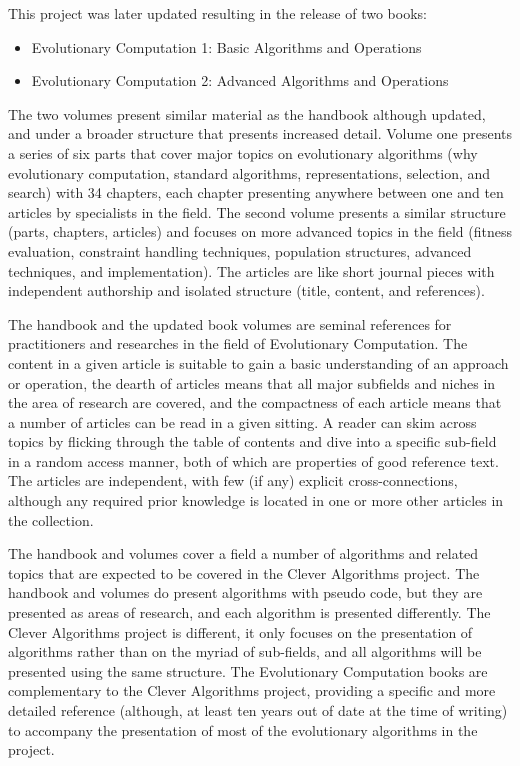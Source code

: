 \documentclass[a4paper, 11pt]{article}
\begin{document}
This project was later updated resulting in the release of two books:

\begin{itemize}
	\item Evolutionary Computation 1: Basic Algorithms and Operations \cite{Baeck2000}
	\item Evolutionary Computation 2: Advanced Algorithms and Operations \cite{Baeck2000a}
\end{itemize} 

The two volumes present similar material as the handbook although updated, and under a broader structure that presents increased detail. Volume one presents a series of six parts that cover major topics on evolutionary algorithms (why evolutionary computation, standard algorithms, representations, selection, and search) with 34 chapters, each chapter presenting anywhere between one and ten articles by specialists in the field. The second volume presents a similar structure (parts, chapters, articles) and focuses on more advanced topics in the field (fitness evaluation, constraint handling techniques, population structures, advanced techniques, and implementation). The articles are like short journal pieces with independent authorship and isolated structure (title, content, and references).

The handbook and the updated book volumes are seminal references for practitioners and researches in the field of Evolutionary Computation. The content in a given article is suitable to gain a basic understanding of an approach or operation, the dearth of articles means that all major subfields and niches in the area of research are covered, and the compactness of each article means that a number of articles can be read in a given sitting. 
A reader can skim across topics by flicking through the table of contents and dive into a specific sub-field in a random access manner, both of which are properties of good reference text. The articles are independent, with few (if any) explicit cross-connections, although any required prior knowledge is located in one or more other articles in the collection.

The handbook and volumes cover a field a number of algorithms and related topics that are expected to be covered in the Clever Algorithms project. The handbook and volumes do present algorithms with pseudo code, but they are presented as areas of research, and each algorithm is presented differently. The Clever Algorithms project is different, it only focuses on the presentation of algorithms rather than on the myriad of sub-fields, and all algorithms will be presented using the same structure. The Evolutionary Computation books are complementary to the Clever Algorithms project, providing a specific and more detailed reference (although, at least ten years out of date at the time of writing) to accompany the presentation of most of the evolutionary algorithms in the project.
\end{document}
